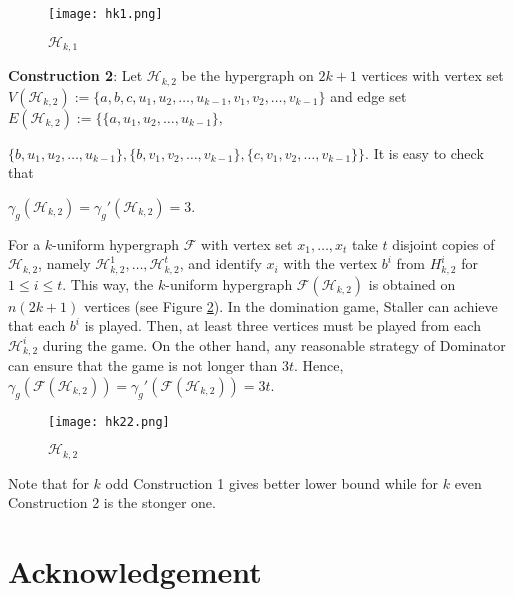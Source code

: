 \documentclass[12pt]{article}
\newcommand\cF{{\mathcal F}}
\newcommand\cH{{\mathcal H}}
\begin{document}
\begin{figure}[h]
 \begin{center}
 \advance\leftskip-4mm
 \texttt{[image: hk1.png]}
  \caption{$\cH_{k,1}$}
  \label{fig:hk1}
  \end{center}
\end{figure}

\noindent
\textbf{Construction 2}: Let $\cH_{k,2}$ be the hypergraph on $2k+1$ vertices with vertex set $V(\cH_{k,2}):=\{a,b,c,u_1,u_2,\dots,u_{k-1},v_1,v_2,\dots, v_{k-1}\}$ and edge set $E(\cH_{k,2}):=\{\{a,u_1,u_2,\dots,u_{k-1}\},$  

\noindent
$\{b,u_1,u_2,\dots,u_{k-1}\}, \{b,v_1,v_2,\dots, v_{k-1}\}, \{c,v_1,v_2,\dots, v_{k-1}\}\}.$ It is easy to check that 

\noindent
$\gamma_g(\cH_{k,2})=\gamma_g'(\cH_{k,2})=3$.

For a $k$-uniform hypergraph $\cF$ with vertex set $x_1,\dots,x_t$ take $t$ disjoint copies of $\cH_{k,2}$, namely $\cH_{k,2}^1,\dots ,\cH_{k,2}^t$, and identify $x_i$ with the vertex $b^i$ from $H_{k,2}^i$ for $1\le i \le t$. This way, the $k$-uniform hypergraph $\cF(\cH_{k,2})$ is obtained on $n(2k+1)$ vertices (see Figure \ref{fig:hk2}). In the domination game, Staller can achieve that each $b^i$ is played. Then, at least three vertices must be played from each $\cH_{k,2}^i$ during the game. On the other hand, any reasonable strategy of Dominator can ensure that the game is not longer than  $3t$. Hence, $\gamma_g(\cF(\cH_{k,2}))=\gamma_g'(\cF(\cH_{k,2}))=3t$.

\begin{figure}[H]
 \begin{center}
 \advance\leftskip-4mm
 \texttt{[image: hk22.png]}
  \caption{$\cH_{k,2}$}
  \label{fig:hk2}
  \end{center}
\end{figure}

\smallskip

Note that for $k$ odd Construction 1 gives better lower bound while for $k$ even Construction 2 is the stonger one.

\medskip



\section*{Acknowledgement}
\end{document}
